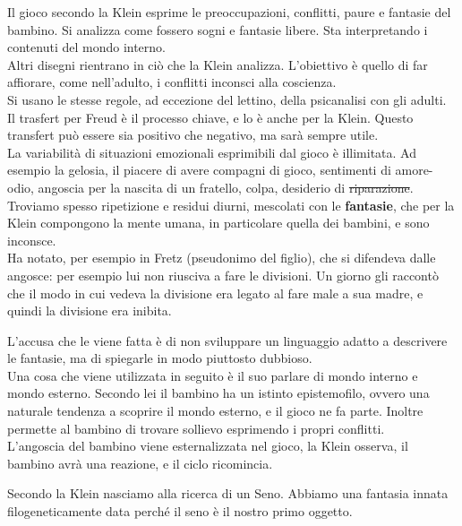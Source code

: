 \documentclass[
]{article}
\begin{document}
Il gioco secondo la Klein esprime le preoccupazioni, conflitti, paure e
fantasie del bambino. Si analizza come fossero sogni e fantasie libere.
Sta interpretando i contenuti del mondo interno.\\
Altri disegni rientrano in ciò che la Klein analizza. L'obiettivo è
quello di far affiorare, come nell'adulto, i conflitti inconsci alla
coscienza.\\
Si usano le stesse regole, ad eccezione del lettino, della psicanalisi
con gli adulti.\\
Il trasfert per Freud è il processo chiave, e lo è anche per la Klein.
Questo transfert può essere sia positivo che negativo, ma sarà sempre
utile.\\
La variabilità di situazioni emozionali esprimibili dal gioco è
illimitata. Ad esempio la gelosia, il piacere di avere compagni di
gioco, sentimenti di amore-odio, angoscia per la nascita di un fratello,
colpa, desiderio di \sout{riparazione}.\\
Troviamo spesso ripetizione e residui diurni, mescolati con le
\textbf{fantasie}, che per la Klein compongono la mente umana, in
particolare quella dei bambini, e sono inconsce.\\
Ha notato, per esempio in Fretz (pseudonimo del figlio), che si
difendeva dalle angosce: per esempio lui non riusciva a fare le
divisioni. Un giorno gli raccontò che il modo in cui vedeva la divisione
era legato al fare male a sua madre, e quindi la divisione era inibita.

L'accusa che le viene fatta è di non sviluppare un linguaggio adatto a
descrivere le fantasie, ma di spiegarle in modo piuttosto dubbioso.\\
Una cosa che viene utilizzata in seguito è il suo parlare di mondo
interno e mondo esterno. Secondo lei il bambino ha un istinto
epistemofilo, ovvero una naturale tendenza a scoprire il mondo esterno,
e il gioco ne fa parte. Inoltre permette al bambino di trovare sollievo
esprimendo i propri conflitti.\\
L'angoscia del bambino viene esternalizzata nel gioco, la Klein osserva,
il bambino avrà una reazione, e il ciclo ricomincia.

Secondo la Klein nasciamo alla ricerca di un Seno. Abbiamo una fantasia
innata filogeneticamente data perché il seno è il nostro primo oggetto.
\end{document}
